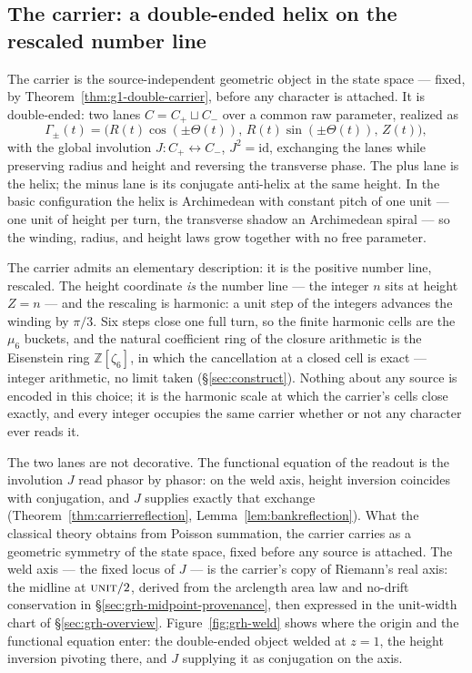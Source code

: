\subsection{The carrier: a double-ended helix on the rescaled number
line}\label{sec:grh-helix}

The carrier is the source-independent geometric object in the state space ---
fixed, by Theorem~\ref{thm:g1-double-carrier}, before any character is
attached. It is double-ended: two lanes \(C=C_+\sqcup C_-\) over a common raw
parameter, realized as
\[
\Gamma_{\pm}(t)=\bigl(R(t)\cos(\pm\Theta(t)),\,R(t)\sin(\pm\Theta(t)),\,Z(t)\bigr),
\]
with the global involution \(J:C_+\leftrightarrow C_-\), \(J^2=\mathrm{id}\),
exchanging the lanes while preserving radius and height and reversing the
transverse phase. The plus lane is the helix; the minus lane is its conjugate
anti-helix at the same height. In the basic configuration the helix is
Archimedean with constant pitch of one unit --- one unit of height per turn,
the transverse shadow an Archimedean spiral --- so the winding, radius, and
height laws grow together with no free parameter.

The carrier admits an elementary description: it is the positive number line,
rescaled. The height coordinate \emph{is} the number line --- the integer
\(n\) sits at height \(Z=n\) --- and the rescaling is harmonic: a unit step
of the integers advances the winding by \(\pi/3\). Six steps close one full
turn, so the finite harmonic cells are the \(\mu_6\) buckets, and the natural
coefficient ring of the closure arithmetic is the Eisenstein ring
\(\mathbb Z[\zeta_6]\), in which the cancellation at a closed cell is exact
--- integer arithmetic, no limit taken (\S\ref{sec:construct}). Nothing about
any source is encoded in this choice; it is the harmonic scale at which the
carrier's cells close exactly, and every integer occupies the same carrier
whether or not any character ever reads it.

The two lanes are not decorative. The functional equation of the readout is
the involution \(J\) read phasor by phasor: on the weld axis, height inversion
coincides with conjugation, and \(J\) supplies exactly that exchange
(Theorem~\ref{thm:carrierreflection}, Lemma~\ref{lem:bankreflection}). What
the classical theory obtains from Poisson summation, the carrier carries as a
geometric symmetry of the state space, fixed before any source is attached.
The weld axis --- the fixed locus of \(J\) --- is the carrier's copy of
Riemann's real axis: the midline at \(\textsc{unit}/2\), derived from the
arclength area law and no-drift conservation in
\S\ref{sec:grh-midpoint-provenance}, then expressed in the unit-width chart
of \S\ref{sec:grh-overview}. Figure~\ref{fig:grh-weld} shows where the origin
and the functional equation enter: the double-ended object welded at
\(z=1\), the height inversion pivoting there, and \(J\) supplying it as
conjugation on the axis.

